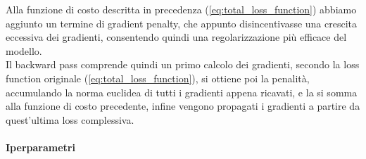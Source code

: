 \documentclass[a4paper,10pt,twocolumn]{article}
\begin{document}
Alla funzione di costo descritta in precedenza (\ref{eq:total_loss_function}) abbiamo aggiunto un termine di gradient penalty, che appunto disincentivasse una crescita
eccessiva dei gradienti, consentendo quindi una regolarizzazione più efficace del modello. \\
Il backward pass comprende quindi un primo calcolo dei gradienti, secondo la loss function originale (\ref{eq:total_loss_function}), si ottiene poi la penalità,
accumulando la norma euclidea di tutti i gradienti appena ricavati, e la si somma alla funzione di costo precedente, infine vengono propagati i gradienti a partire da quest'ultima loss complessiva.

\paragraph{Iperparametri}
\end{document}
